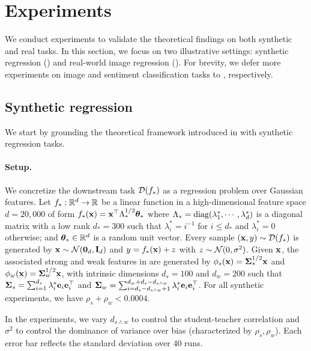 \section{Experiments}\label{sec:experiments}
We conduct experiments to validate the theoretical findings on both synthetic and real tasks. In this section, we focus on two illustrative settings: synthetic regression () and real-world image regression (). For brevity, we defer more experiments on image and sentiment classification tasks to , respectively.

\subsection{Synthetic regression}\label{sec:exp_synthetic}
We start by grounding the theoretical framework introduced in  with synthetic regression tasks. 

\paragraph{Setup.}
We concretize the downstream task $\mathcal{D}(f_*)$ as a regression problem over Gaussian features. 
Let $f_*: \mathbb{R}^d \to \mathbb{R}$ be a linear function in a high-dimensional feature space $d=20,000$ of form $f_*(\mathbf{x}) = \mathbf{x}^\top \Lambda_*^{1/2} \boldsymbol{\theta}_*$ where $\Lambda_* = \mathop{\mathrm{diag}}(\lambda^*_1, \cdots, \lambda^*_d)$ is a diagonal matrix with a low rank $d_* = 300$ such that $\lambda^*_i = i^{-1}$ for $i \le d_*$ and $\lambda^*_i = 0$ otherwise; and $\boldsymbol{\theta}_* \in \mathbb{R}^{d}$ is a random unit vector.
Every sample $(\mathbf{x}, y) \sim \mathcal{D}(f_*)$ is generated by $\mathbf{x} \sim \mathcal{N}(\textbf0_d, \mathbf{I}_d)$ and $y = f_*(\mathbf{x}) + z$ with $z \sim \mathcal{N}(0, \sigma^2)$.
Given $\mathbf{x}$, the associated strong and weak features in  are generated by $\phi_s(\mathbf{x}) = \boldsymbol{\Sigma}_s^{1/2} \mathbf{x}$ and $\phi_w(\mathbf{x}) = \boldsymbol{\Sigma}_w^{1/2} \mathbf{x}$, with intrinsic dimensions $d_s = 100$ and $d_w = 200$ such that $\boldsymbol{\Sigma}_s = \sum_{i=1}^{d_s} \lambda^*_i \mathbf{e}_i \mathbf{e}_i^\top$ and $\boldsymbol{\Sigma}_w = \sum_{i=d_s - d_{s \wedge w} + 1}^{d_w + d_s - d_{s \wedge w}} \lambda^*_i \mathbf{e}_i \mathbf{e}_i^\top$. 
For all synthetic experiments, we have $\rho_s + \rho_w < 0.0004$.

In the experiments, we vary $d_{s \wedge w}$ to control the student-teacher correlation and $\sigma^2$ to control the dominance of variance over bias (characterized by $\rho_s, \rho_w$). Each error bar reflects the standard deviation over $40$ runs. 

